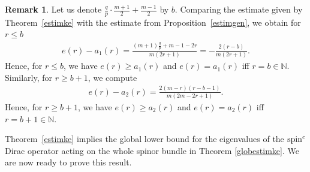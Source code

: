 \documentclass[10pt,a4paper]{amsart}
\numberwithin{equation}{section}
\theoremstyle{definition}
\newtheorem{Remark}[thm]{Remark}
\begin{document}
\begin{Remark}\label{comp} Let us denote $\frac{q}{p}\cdot\frac{m+1}{2}+\frac{m-1}{2}$  by $b$.
Comparing the estimate given by Theorem~\ref{estimke} with the estimate from Proposition~\ref{estimgen}, we obtain for $r\leq  b$
\begin{gather*}e(r)-a_1(r)=\frac{(m+1)\frac{q}{p}+m-1-2r}{m(2r+1)}=-\frac{2(r-b)}{m(2r+1)}.\end{gather*}
Hence, for $r \leq  b$, we have $e(r)\geq a_1(r)$ and $e(r)=a_1(r)$ if\/f $r=b\in\mathbb{N}$.
Similarly, for $r\geq b+1$, we compute
\begin{gather*}e(r)-a_2(r)=\frac{2(m-r)(r-b-1)}{m(2m-2r+1)}.\end{gather*}
Hence, for  $r\geq b+1$, we have $e(r)\geq a_2(r)$ and $e(r)=a_2(r)$ if\/f $r=b+1\in\mathbb{N}$.
\end{Remark}


Theorem~\ref{estimke} implies the global lower bound for the eigenvalues of the ${\mathop{\rm spin}^c}$ Dirac operator acting on the whole spinor bundle in Theorem \ref{globestimke}. We are now ready to prove this result.
\end{document}
